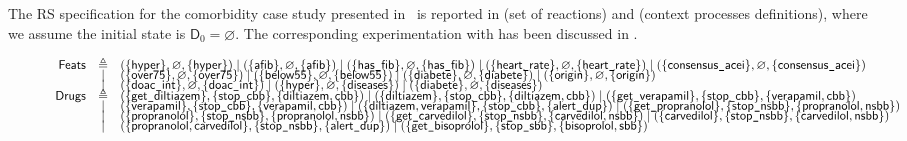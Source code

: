 The RS specification for the comorbidity case study presented in~\cite{DBLP:conf/cmsb/BowlesBBFGM24} is reported in  (set of reactions) and  (context processes definitions), where we assume the initial state is $\mathsf{D}_0  =  \varnothing$.
The corresponding experimentation with \GROOVE has been discussed in .

\begin{figure}[t]
\fontsize{6}{0}
\[
\begin{array}{rcl}
\mathsf{Feats} &  \triangleq 
& (\{\ent{hyper}\},\varnothing,\{\ent{hyper}\})
\mid  (\{\mathsf{afib}\},\varnothing,\{\ent{afib}\})
\mid  (\{\ents{has}{fib}\},\varnothing,\{\ents{has}{fib}\})
\mid  (\{\ents{heart}{rate}\},\varnothing,\{\ents{heart}{rate}\})
\mid  (\{\ents{consensus}{acei}\},\varnothing,\{\ents{consensus}{acei}\})
\\[-4pt] & \mid &  (\{\ent{over75}\},\varnothing,\{\ent{over75}\})
\mid  (\{\ent{below55}\},\varnothing,\{\ent{below55}\})
\mid  (\{\ent{diabete}\},\varnothing,\{\ent{diabete}\})
\mid  (\{\ent{origin}\},\varnothing,\{\ent{origin}\})
\\[-4pt] & \mid &  (\{\ents{doac}{int}\},\varnothing,\{\ents{doac}{int}\})
\mid  (\{\ent{hyper}\},\varnothing,\{\ent{diseases}\})
\mid  (\{\ent{diabete}\},\varnothing,\{\ent{diseases}\})
\\[-4pt]
\mathsf{Drugs} &  \triangleq 
& (\{\ents{get}{diltiazem}\},\{\ents{stop}{cbb}\},\{\ent{diltiazem},\ent{cbb}\})
\mid  (\{\ent{diltiazem}\},\{\ents{stop}{cbb}\},\{\ent{diltiazem},\ent{cbb}\})
\mid  (\{\ents{get}{verapamil}\},\{\ents{stop}{cbb}\},\{\ent{verapamil},\ent{cbb}\})
\\[-4pt] & \mid &  (\{\ent{verapamil}\},\{\ents{stop}{cbb}\},\{\ent{verapamil},\ent{cbb}\})
\mid  (\{\ent{diltiazem},\ent{verapamil}\},\{\ents{stop}{cbb}\},\{\ents{alert}{dup}\})
%
\mid  (\{\ents{get}{propranolol}\},\{\ents{stop}{nsbb}\},\{\ent{propranolol},\ent{nsbb}\})
\\[-4pt] & \mid &  (\{\ent{propranolol}\},\{\ents{stop}{nsbb}\},\{\ent{propranolol},\ent{nsbb}\})
\mid  (\{\ents{get}{carvedilol}\},\{\ents{stop}{nsbb}\},\{\ent{carvedilol},\ent{nsbb}\})
\mid  (\{\ent{carvedilol}\},\{\ents{stop}{nsbb}\},\{\ent{carvedilol},\ent{nsbb}\})
\\[-4pt] & \mid &  (\{\ent{propranolol},\ent{carvedilol}\},\{\ents{stop}{nsbb}\},\{\ents{alert}{dup}\})
%
\mid  (\{\ents{get}{bisoprolol}\},\{\ents{stop}{sbb}\},\{\ent{bisoprolol},\ent{sbb}\})

\end{array}\]
\end{figure}
